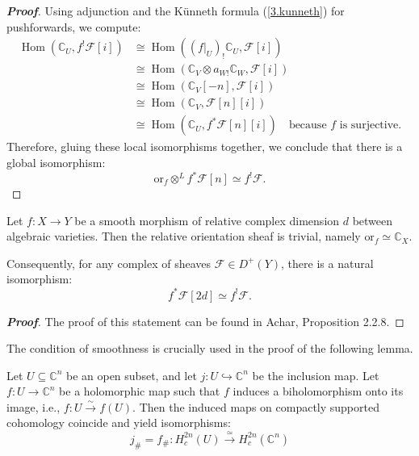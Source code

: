 \begin{proof}[\textbf{Proof}]
Using adjunction and the Künneth formula (\ref{3.kunneth}) for pushforwards, we compute:
\begin{align*}
    \operatorname{Hom}(\mathbb{C}_U, f^! \mathcal{F}[i]) &\cong \operatorname{Hom}((f|_U)_! \mathbb{C}_U, \mathcal{F}[i]) \\
    &\cong \operatorname{Hom}(\mathbb{C}_V \otimes a_{W!} \mathbb{C}_W, \mathcal{F}[i]) \\
    &\cong \operatorname{Hom}(\mathbb{C}_V[-n], \mathcal{F}[i])\\
    &\cong \operatorname{Hom}(\mathbb{C}_V, \mathcal{F}[n][i]) \\
    &\cong \operatorname{Hom}(\mathbb{C}_U, f^* \mathcal{F}[n][i]) \quad \text{because } f \text{ is surjective.}
\end{align*}
Therefore, gluing these local isomorphisms together, we conclude that there is a global isomorphism:
\begin{equation*}
    \text{or}_f \otimes^{L} f^* \mathcal{F}[n] \simeq f^! \mathcal{F}.
\end{equation*}
\end{proof}

\begin{theorem}
Let $f \colon X \longrightarrow Y$ be a smooth morphism of relative complex dimension $d$ between algebraic varieties. Then the relative orientation sheaf is trivial, namely $\text{or}_f \simeq \mathbb{C}_X$. 

Consequently, for any complex of sheaves $\mathcal{F} \in D^+(Y)$, there is a natural isomorphism:
\begin{equation*}
    f^* \mathcal{F}[2d] \simeq f^! \mathcal{F}.
\end{equation*}
\end{theorem}

\begin{proof}[\textbf{Proof}]
The proof of this statement can be found in Achar, Proposition 2.2.8.
\end{proof}

\begin{remark}
    The condition of smoothness is crucially used in the proof of the following lemma.

\begin{lemma}
Let $U \subseteq \mathbb{C}^n$ be an open subset, and let $j \colon U \hookrightarrow \mathbb{C}^n$ be the inclusion map. Let $f \colon U \longrightarrow \mathbb{C}^n$ be a holomorphic map such that $f$ induces a biholomorphism onto its image, i.e., $f \colon U \xrightarrow{\sim} f(U)$. Then the induced maps on compactly supported cohomology coincide and yield isomorphisms:
\begin{equation*}
    j_\# = f_\# \colon H_c^{2n}(U) \xrightarrow{\simeq} H_c^{2n}(\mathbb{C}^n) 
\end{equation*}
\end{lemma}
\end{remark}

